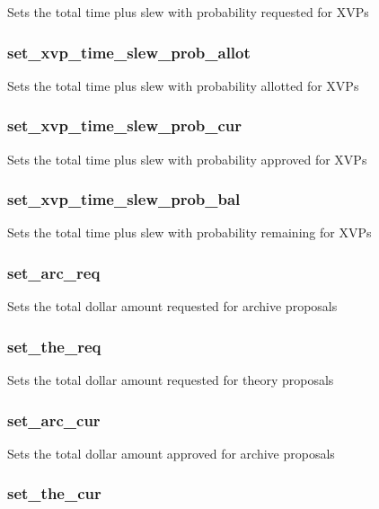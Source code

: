 \documentclass{article}
\begin{document}
Sets the total time plus slew with probability requested for XVPs

\subsubsection*{set\_xvp\_time\_slew\_prob\_allot\label{Panel_set_xvp_time_slew_prob_allot}}


Sets the total time plus slew with probability allotted for XVPs

\subsubsection*{set\_xvp\_time\_slew\_prob\_cur\label{Panel_set_xvp_time_slew_prob_cur}}


Sets the total time plus slew with probability approved for XVPs

\subsubsection*{set\_xvp\_time\_slew\_prob\_bal\label{Panel_set_xvp_time_slew_prob_bal}}


Sets the total time plus slew with probability remaining for XVPs

\subsubsection*{set\_arc\_req\label{Panel_set_arc_req}}


Sets the total dollar amount requested for archive proposals

\subsubsection*{set\_the\_req\label{Panel_set_the_req}}


Sets the total dollar amount requested for theory proposals

\subsubsection*{set\_arc\_cur\label{Panel_set_arc_cur}}


Sets the total dollar amount approved for archive proposals

\subsubsection*{set\_the\_cur\label{Panel_set_the_cur}}
\end{document}
